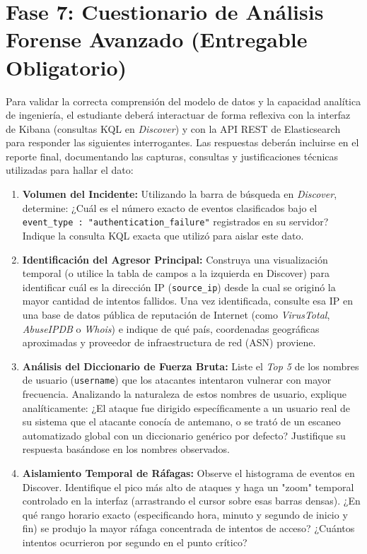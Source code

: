 \documentclass[
  coursetitle={Cómputo Nube y Tecnologías Emergentes},
  coursehours={96},
  coursedate={Verano 2026},
  doctype={Guía de Laboratorio Práctico},
  otherlangs={english,french},
  authorname={Lázaro},
  authorsurname={Bustio-Martínez},
  authortitle={PhD},
  role={Profesor Investigador},
  email={lbustio@inaoe.mx},
  phone={5559504000},
  ext={7459},
  institution={Instituto Nacional de Astrofísica, Óptica y Electrónica (INAOE)},
  department={Maestría en Ciencias en Tecnologías de Seguridad},
  address={Luis Enrique Erro 1, Sta. Ma. Tonantzintla, San Andrés Cholula, CP 72840, Puebla, México},
  margin={0.5in}
]{../../lbustio_lecture_notes}
\begin{document}
\section{Fase 7: Cuestionario de Análisis Forense Avanzado (Entregable Obligatorio)}

Para validar la correcta comprensión del modelo de datos y la capacidad analítica de ingeniería, el estudiante deberá interactuar de forma reflexiva con la interfaz de Kibana (consultas KQL en \textit{Discover}) y con la API REST de Elasticsearch para responder las siguientes interrogantes. Las respuestas deberán incluirse en el reporte final, documentando las capturas, consultas y justificaciones técnicas utilizadas para hallar el dato:

\begin{enumerate}
    \item \textbf{Volumen del Incidente:} Utilizando la barra de búsqueda en \textit{Discover}, determine: ¿Cuál es el número exacto de eventos clasificados bajo el \texttt{event\_type : "authentication\_failure"} registrados en su servidor? Indique la consulta KQL exacta que utilizó para aislar este dato.
    
    \item \textbf{Identificación del Agresor Principal:} Construya una visualización temporal (o utilice la tabla de campos a la izquierda en Discover) para identificar cuál es la dirección IP (\texttt{source\_ip}) desde la cual se originó la mayor cantidad de intentos fallidos. Una vez identificada, consulte esa IP en una base de datos pública de reputación de Internet (como \textit{VirusTotal}, \textit{AbuseIPDB} o \textit{Whois}) e indique de qué país, coordenadas geográficas aproximadas y proveedor de infraestructura de red (ASN) proviene.
    
    \item \textbf{Análisis del Diccionario de Fuerza Bruta:} Liste el \textit{Top 5} de los nombres de usuario (\texttt{username}) que los atacantes intentaron vulnerar con mayor frecuencia. Analizando la naturaleza de estos nombres de usuario, explique analíticamente: ¿El ataque fue dirigido específicamente a un usuario real de su sistema que el atacante conocía de antemano, o se trató de un escaneo automatizado global con un diccionario genérico por defecto? Justifique su respuesta basándose en los nombres observados.
    
    \item \textbf{Aislamiento Temporal de Ráfagas:} Observe el histograma de eventos en Discover. Identifique el pico más alto de ataques y haga un "zoom" temporal controlado en la interfaz (arrastrando el cursor sobre esas barras densas). ¿En qué rango horario exacto (especificando hora, minuto y segundo de inicio y fin) se produjo la mayor ráfaga concentrada de intentos de acceso? ¿Cuántos intentos ocurrieron por segundo en el punto crítico?
    

\end{enumerate}
\end{document}
